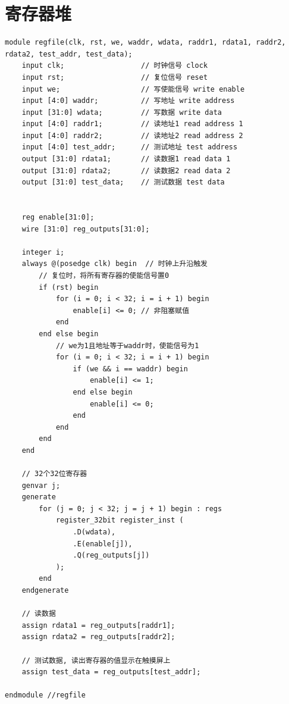 \documentclass[AutoFakeBold]{LZUThesis}
\begin{document}
\section{寄存器堆}
\begin{lstlisting}[style={verilog-style}]
module regfile(clk, rst, we, waddr, wdata, raddr1, rdata1, raddr2, rdata2, test_addr, test_data);
    input clk;                  // 时钟信号 clock
    input rst;                  // 复位信号 reset
    input we;                   // 写使能信号 write enable
    input [4:0] waddr;          // 写地址 write address
    input [31:0] wdata;         // 写数据 write data
    input [4:0] raddr1;         // 读地址1 read address 1
    input [4:0] raddr2;         // 读地址2 read address 2
    input [4:0] test_addr;      // 测试地址 test address
    output [31:0] rdata1;       // 读数据1 read data 1
    output [31:0] rdata2;       // 读数据2 read data 2
    output [31:0] test_data;    // 测试数据 test data
    

    reg enable[31:0];
    wire [31:0] reg_outputs[31:0];

    integer i;
    always @(posedge clk) begin  // 时钟上升沿触发
        // 复位时，将所有寄存器的使能信号置0
        if (rst) begin
            for (i = 0; i < 32; i = i + 1) begin
                enable[i] <= 0; // 非阻塞赋值
            end
        end else begin
            // we为1且地址等于waddr时，使能信号为1
            for (i = 0; i < 32; i = i + 1) begin
                if (we && i == waddr) begin
                    enable[i] <= 1;
                end else begin
                    enable[i] <= 0;
                end
            end
        end
    end

    // 32个32位寄存器
    genvar j;
    generate
        for (j = 0; j < 32; j = j + 1) begin : regs
            register_32bit register_inst (
                .D(wdata),
                .E(enable[j]),
                .Q(reg_outputs[j])
            );
        end
    endgenerate

    // 读数据
    assign rdata1 = reg_outputs[raddr1];
    assign rdata2 = reg_outputs[raddr2];

    // 测试数据, 读出寄存器的值显示在触摸屏上
    assign test_data = reg_outputs[test_addr];

endmodule //regfile

\end{lstlisting}
\end{document}
